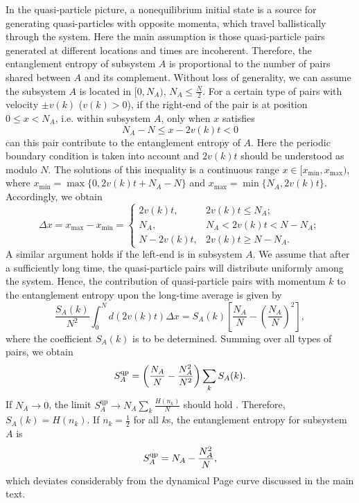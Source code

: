 In the quasi-particle picture, a nonequilibrium %
initial state is a source for generating quasi-particles
with opposite momenta, which travel ballistically through the system.
Here the main assumption is %
 those quasi-particle pairs generated %
at different locations and times are incoherent. Therefore, the entanglement entropy
of subsystem $A$ is proportional to the number of pairs shared between
$A$ and its complement. Without loss of generality, we can assume
the subsystem $A$ is located in $[0,N_{A})$, $N_{A}\leq\frac{N}{2}$.
For a certain type of pairs with velocity $\pm v(k)$ ($v(k)>0$),
if the right-end of the pair is at position $0\leq x<N_{A}$, i.e.
within subsystem $A$, only when $x$ satisfies
\[
N_{A}-N\leq x-2v(k)t<0
\]
can this pair contribute to the entanglement entropy of $A$. Here the periodic
boundary condition is taken into account and $2v(k)t$ should be understood
as modulo $N$. The solutions of this inequality is a continuous range
$x\in[x_{\mathrm{min}},x_{\mathrm{max}})$, where $x_{\mathrm{min}}=\max\{0,2v(k)t+N_{A}-N\}$ and 
$x_{\mathrm{max}}=\min\{N_{A},2v(k)t\}$. Accordingly, we obtain
\[
\Delta x=x_{\mathrm{max}}-x_{\mathrm{min}}=\begin{cases}
2v(k)t, & 2v(k)t\leq N_{A};\\
N_{A}, & N_{A}<2v(k)t<N-N_{A};\\
N-2v(k)t, & 2v(k)t\geq N-N_{A}.
\end{cases}
\]
A similar argument holds if the left-end is in subsystem $A$. We
assume that after a sufficiently long %
time, the quasi-particle pairs will distribute
uniformly among the system. Hence, %
the contribution of %
quasi-particle pairs with momentum $k$ to the entanglement entropy upon the long-time average is given by %
\[
\frac{S_{A}(k)}{N^{2}}\int_{0}^{N}d(2v(k)t)\Delta x=S_{A}(k)\left[\frac{N_{A}}{N}-\left(\frac{N_{A}}{N}\right)^{2}\right],
\]
where the coefficient $S_A(k)$ is to be determined. Summing over all types of pairs, we obtain 
\[
S^{\rm qp}_{A}=\left(\frac{N_{A}}{N}-\frac{N_{A}^{2}}{N^{2}}\right)\sum_{k}S_{A}(k).
\]
If $N_{A}\to0$, the limit $S_{A}^\mathrm{qp}\to N_{A}\sum_{k}\frac{H(n_{k})}{N}$
should hold \citep{Alba2018}. Therefore, $S_{A}(k)=H(n_{k})$. If
$n_{k}=\frac{1}{2}$ for all $k$s, the entanglement entropy for subsystem
$A$ is
\[
S^{\rm qp}_{A}=N_{A}-\frac{N_{A}^{2}}{N},
\]
which deviates considerably from %
the dynamical Page curve %
discussed in the main text.

